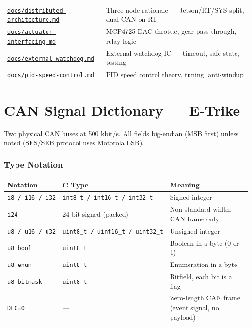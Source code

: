 \begin{longtable}[]{@{}
  >{\raggedright\arraybackslash}p{}
  >{\raggedright\arraybackslash}p{}@{}}
\href{docs/distributed-architecture.md}{\texttt{docs/distributed-architecture.md}}
& Three-node rationale --- Jetson/RT/SYS split, dual-CAN on RT \\
\href{docs/actuator-interfacing.md}{\texttt{docs/actuator-interfacing.md}} &
MCP4725 DAC throttle, gear pass-through, relay logic \\
\href{docs/external-watchdog.md}{\texttt{docs/external-watchdog.md}} & External
watchdog IC --- timeout, safe state, testing \\
\href{docs/pid-speed-control.md}{\texttt{docs/pid-speed-control.md}} & PID speed
control theory, tuning, anti-windup \\
\end{longtable}


\chapter{CAN Signal Dictionary --- E-Trike}\label{can-signal-dictionary-e-trike}

Two physical CAN buses at 500 kbit/s. All fields big-endian (MSB first) unless
noted (SES/SEB protocol uses Motorola LSB).

\subsection{Type Notation}\label{type-notation}

\begin{longtable}[]{@{}lll@{}}
\toprule\noalign{}
Notation & C Type & Meaning \\
\midrule\noalign{}
\endhead
\bottomrule\noalign{}
\endlastfoot
\texttt{i8\ /\ i16\ /\ i32} & \texttt{int8\_t\ /\ int16\_t\ /\ int32\_t} &
Signed integer \\
\texttt{i24} & 24-bit signed (packed) & Non-standard width, CAN frame only \\
\texttt{u8\ /\ u16\ /\ u32} & \texttt{uint8\_t\ /\ uint16\_t\ /\ uint32\_t} &
Unsigned integer \\
\texttt{u8\ bool} & \texttt{uint8\_t} & Boolean in a byte (0 or 1) \\
\texttt{u8\ enum} & \texttt{uint8\_t} & Enumeration in a byte \\
\texttt{u8\ bitmask} & \texttt{uint8\_t} & Bitfield, each bit is a flag \\
\texttt{DLC=0} & --- & Zero-length CAN frame (event signal, no payload) \\
\end{longtable}

